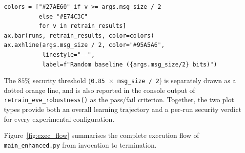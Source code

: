 \documentclass[12pt, a4paper]{article}
\newcommand{\code}[1]{\texttt{\color{CodeRed}#1}}
\begin{document}
\begin{lstlisting}[caption={Eve retraining bar chart generation}]
colors = ["#27AE60" if v >= args.msg_size / 2
          else "#E74C3C"
          for v in retrain_results]
ax.bar(runs, retrain_results, color=colors)
ax.axhline(args.msg_size / 2, color="#95A5A6",
           linestyle="--",
           label=f"Random baseline ({args.msg_size/2} bits)")
\end{lstlisting}

The $85\%$ security threshold (\code{0.85 $\times$ msg\_size / 2}) is separately drawn
as a dotted orange line, and is also reported in the console output of
\code{retrain\_eve\_robustness()} as the pass/fail criterion. Together, the two
plot types provide both an overall learning trajectory and a per-run security
verdict for every experimental configuration.
\label{subsec:exec_flow}

Figure~\ref{fig:exec_flow} summarises the complete execution flow of
\code{main\_enhanced.py} from invocation to termination.
\end{document}
